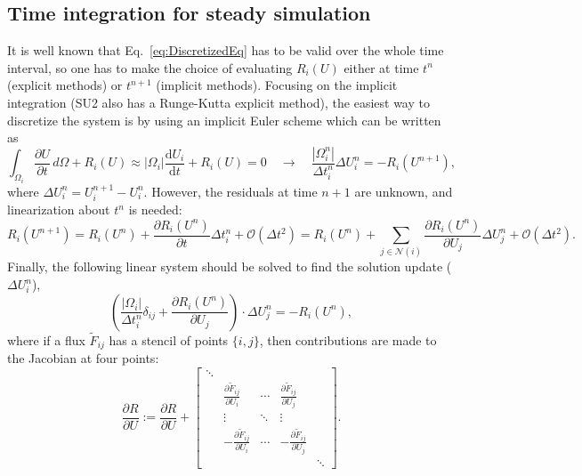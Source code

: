 \subsection{Time integration for steady simulation}
It is well known that Eq.~\ref{eq:DiscretizedEq} has to be valid over the whole time interval, so one has to make the choice of evaluating $R_i(U)$ either at time $t^{n}$ (explicit methods) or $t^{n+1}$ (implicit methods). Focusing on the implicit integration (SU2 also has a Runge-Kutta explicit method), the easiest way to discretize the system is by using an implicit Euler scheme which can be written as
\begin{equation}
\int_{\Omega_i}{\frac{\partial{U}}{\partial{t}}}\,d\Omega + R_i(U) \approx |\Omega_i| \frac{\mathrm{d}U_i}{\mathrm{d}t} + R_i(U) = 0 \quad \rightarrow \quad \frac{|\Omega_i^n|}{\Delta t_i^n} \Delta U_i^n = - R_i(U^{n+1}),
\label{eq:Implicit_Euler}
\end{equation}
where $\Delta U_i^n = U_i^{n+1} - U_i^n$. However, the residuals at time $n+1$ are unknown, and linearization about $t^n$ is needed:
\begin{equation}
R_i(U^{n+1})  =  R_i(U^n) + \frac{\partial R_i (U^n)}{\partial t} \Delta t_i^n + \mathcal{O}(\Delta t^2) = R_i(U^n) + \sum_{j \in \mathcal{N}(i)} \frac{\partial R_i (U^n)}{\partial U_j} \Delta U_j^n + \mathcal{O}(\Delta t^2).
\end{equation}
Finally, the following linear system should be solved to find the solution update ($\Delta U_i^n$),
\begin{equation}\label{linear_system}
\left( \frac{|\Omega_i|}{\Delta t_i^n} \delta_{ij} + \frac{\partial R_i (U^n)}{\partial U_j} \right) \cdot \Delta U_j^n = -R_i(U^n),
\end{equation}
where if a flux $\tilde F_{ij}$ has a stencil of points $\{i, j\}$, then contributions are made to the Jacobian at four points:
\begin{equation}
\frac{\partial R}{\partial U} := \frac{\partial R}{\partial U} + \left[
\begin{array}{ccccc}
\ddots & & & & \\
 & \frac{\partial \tilde{F}_{ij}}{\partial U_i} & \cdots & \frac{\partial \tilde{F}_{ij}}{\partial U_j} & \\
 & \vdots & \ddots & \vdots & \\
 & -\frac{\partial \tilde{F}_{ij}}{\partial U_i} & \cdots & -\frac{\partial \tilde{F}_{ij}}{\partial U_j} & \\
 & & & & \ddots 
\end{array}
\right].
\end{equation}

